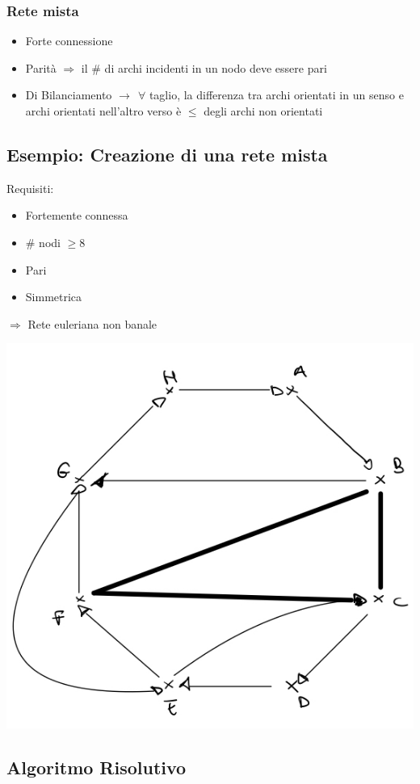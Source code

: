 \documentclass[12pt,a4paper]{article}
\begin{document}
\subsubsection{Rete mista}
\begin{itemize}
\item Forte connessione
\item Parità $\Rightarrow$ il \# di archi incidenti in un nodo deve essere pari
\item Di Bilanciamento $\rightarrow \ \ \forall $ taglio, la differenza tra archi orientati in un senso e archi orientati nell'altro verso è $\leq$ degli archi non orientati 
\end{itemize}

\subsection{Esempio: Creazione di una rete mista}
Requisiti:\begin{itemize}
\item Fortemente connessa
\item \# nodi $\geq 8$
\item Pari
\item Simmetrica
\end{itemize}
$\Rightarrow$ Rete euleriana non banale
\begin{center}
\includegraphics[width=0.3\columnwidth]{img/es_rete_mista.jpeg}\\
\end{center}

\subsection{Algoritmo Risolutivo}
\end{document}
